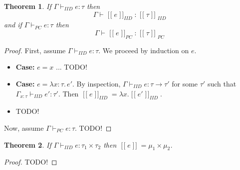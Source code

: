 \documentclass{article}
\newtheorem*{theorem}{Theorem}
\DeclareMathOperator*\llb{[\![}
\DeclareMathOperator*\rrb{]\!]}
\begin{document}
\begin{theorem}
	If $\Gamma \vdash_{IID} e : \tau$ 
	then $$\Gamma \vdash \llb e {\rrb}_{IID} : {\llb \tau\rrb}_{IID}$$
	and if $\Gamma \vdash_{PC} e : \tau$ 
	then $$\Gamma \vdash \llb e {\rrb}_{PC} : {\llb \tau\rrb}_{PC}$$
\end{theorem}

\begin{proof}
First, assume $\Gamma \vdash_{IID} e : \tau$.
We proceed by induction on $e$.
\begin{itemize}
	\item {\bf Case:} $e = x$ ... TODO!
	
	\item {\bf Case:} $e = \lambda x : \tau .\, e'$.
	By inspection, $\Gamma \vdash_{IID} e : \tau \to \tau'$ for some $\tau'$ such that
	$\Gamma_{x : \tau} \vdash_{IID}  e' : \tau'$.
	Then $\llb e {\rrb}_{IID} = \lambda x. \llb e' \rrb_{IID}$.
	
	\item TODO!
\end{itemize}

Now, assume $\Gamma \vdash_{PC} e : \tau$. TODO!
\end{proof}

\begin{theorem}
	If $\Gamma \vdash_{IID} e : \tau_1 \times \tau_2$
	then $\llb e \rrb = \mu_1 \times \mu_2$.
\end{theorem}

\begin{proof}
TODO!
\end{proof}
\end{document}
